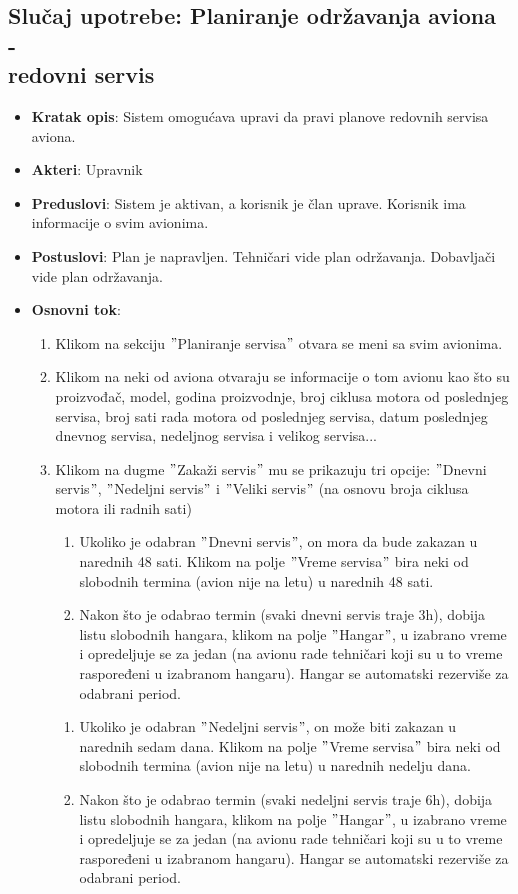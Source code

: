 \documentclass[a4paper]{article}
\begin{document}
\subsection{Slučaj upotrebe: Planiranje održavanja aviona - \\redovni servis}
\label{subsec:redovan_servis}
\begin{itemize}
    \item \textbf{Kratak opis}: Sistem omogućava upravi da pravi planove redovnih servisa aviona.
    \item \textbf{Akteri}: Upravnik
    \item \textbf{Preduslovi}: Sistem je aktivan, a korisnik je član uprave. Korisnik ima informacije o svim avionima.
    \item \textbf{Postuslovi}: Plan je napravljen. Tehničari vide plan održavanja. Dobavljači vide plan održavanja.
    \item \textbf{Osnovni tok}: 
    \begin{enumerate}
        \item Klikom na sekciju $"$Planiranje servisa$"$ otvara se meni sa svim avionima.

        \item Klikom na neki od aviona otvaraju se informacije o tom avionu kao što su proizvođač, model, godina proizvodnje, broj ciklusa motora od poslednjeg servisa, broj sati rada motora od poslednjeg servisa, datum poslednjeg dnevnog servisa, nedeljnog servisa i velikog servisa...

        \item Klikom na dugme $"$Zakaži servis$"$ mu se prikazuju tri opcije: $"$Dnevni servis$"$, $"$Nedeljni servis$"$ i $"$Veliki servis$"$ (na osnovu broja ciklusa motora ili radnih sati)
        \begin{enumerate}[label=3.1.\arabic*]
            \item Ukoliko je odabran $"$Dnevni servis$"$, on mora da bude zakazan u narednih 48 sati. Klikom na polje $"$Vreme servisa$"$ bira neki od slobodnih termina (avion nije na letu) u narednih 48 sati.
            \item Nakon što je odabrao termin (svaki dnevni servis traje 3h), dobija listu slobodnih hangara, klikom na polje $"$Hangar$"$, u izabrano vreme i opredeljuje se za jedan (na avionu rade tehničari koji su u to vreme raspoređeni u izabranom hangaru). Hangar se automatski rezerviše za odabrani period.
        \end{enumerate}
        \begin{enumerate}[label=3.2.\arabic*]
            \item Ukoliko je odabran $"$Nedeljni servis$"$, on može biti zakazan u narednih sedam dana. Klikom na polje $"$Vreme servisa$"$ bira neki od slobodnih termina (avion nije na letu) u narednih nedelju dana.
            \item Nakon što je odabrao termin (svaki nedeljni servis traje 6h), dobija listu slobodnih hangara, klikom na polje $"$Hangar$"$, u izabrano vreme i opredeljuje se za jedan (na avionu rade tehničari koji su u to vreme raspoređeni u izabranom hangaru). Hangar se automatski rezerviše za odabrani period.
        \end{enumerate}


\end{enumerate}
\end{itemize}
\end{document}
